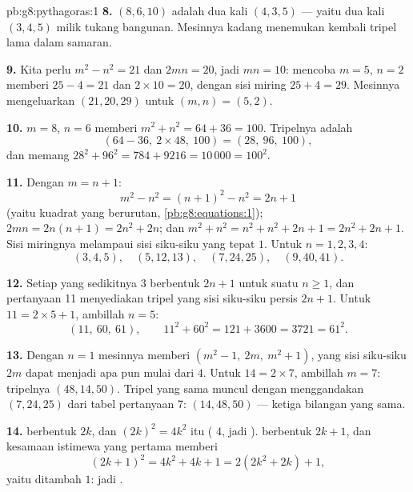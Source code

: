 \begin{solution}{pb:g8:pythagoras:1}
\textbf{8.} $(8, 6, 10)$ adalah dua kali $(4, 3, 5)$ --- yaitu dua
kali $(3, 4, 5)$ milik tukang bangunan. Mesinnya kadang menemukan
kembali tripel lama dalam samaran.

\textbf{9.} Kita perlu $m^2 - n^2 = 21$ dan $2mn = 20$, jadi
$mn = 10$: mencoba $m = 5$, $n = 2$ memberi $25 - 4 = 21$ dan
$2 \times 10 = 20$, dengan sisi miring $25 + 4 = 29$. Mesinnya
mengeluarkan $(21, 20, 29)$ untuk $(m, n) = (5, 2)$.

\textbf{10.} $m = 8$, $n = 6$ memberi $m^2 + n^2 = 64 + 36 = 100$.
Tripelnya adalah
\[
\left(64 - 36,\ 2 \times 48,\ 100\right) = (28,\ 96,\ 100),
\]
dan memang $28^2 + 96^2 = 784 + 9216 = 10\,000 = 100^2$.

\textbf{11.} Dengan $m = n + 1$:
\[
m^2 - n^2 = (n + 1)^2 - n^2 = 2n + 1
\]
(yaitu  kuadrat yang berurutan, \cref{pb:g8:equations:1});
$2mn = 2n(n + 1) = 2n^2 + 2n$; dan
$m^2 + n^2 = n^2 + n^2 + 2n + 1 = 2n^2 + 2n + 1$. Sisi miringnya
melampaui sisi siku-siku yang  tepat $1$. Untuk $n = 1, 2, 3, 4$:
\[
(3, 4, 5), \quad (5, 12, 13), \quad (7, 24, 25), \quad
(9, 40, 41) .
\]

\textbf{12.} Setiap  yang sedikitnya $3$ berbentuk
$2n + 1$ untuk suatu $n \geq 1$, dan pertanyaan 11 menyediakan tripel
yang sisi siku-siku  persis $2n + 1$. Untuk
$11 = 2 \times 5 + 1$, ambillah $n = 5$:
\[
(11,\ 60,\ 61),
\qquad
11^2 + 60^2 = 121 + 3600 = 3721 = 61^2 .
\]

\textbf{13.} Dengan $n = 1$ mesinnya memberi
$\left(m^2 - 1,\ 2m,\ m^2 + 1\right)$, yang sisi siku-siku 
$2m$ dapat menjadi  apa pun mulai dari $4$. Untuk
$14 = 2 \times 7$, ambillah $m = 7$: tripelnya $(48, 14, 50)$. Tripel
yang sama muncul dengan menggandakan $(7, 24, 25)$ dari tabel
pertanyaan 7: $(14, 48, 50)$ --- ketiga bilangan yang sama.

\textbf{14.}  berbentuk $2k$, dan $(2k)^2 = 4k^2$ itu
 ( $4$, jadi ).  berbentuk
$2k + 1$, dan kesamaan istimewa yang pertama memberi
\[
(2k + 1)^2 = 4k^2 + 4k + 1 = 2\left(2k^2 + 2k\right) + 1 ,
\]
yaitu  ditambah $1$: jadi .


\end{solution}
